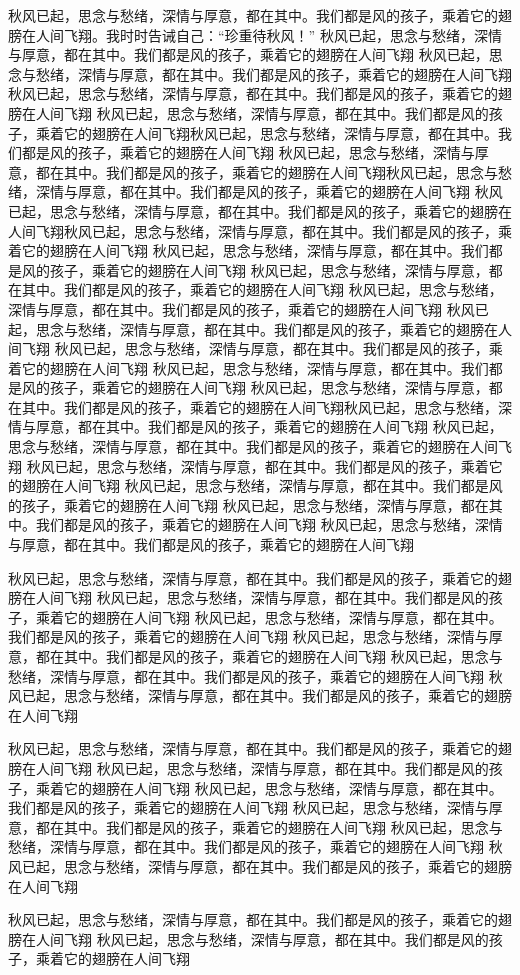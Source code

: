 秋风已起，思念与愁绪，深情与厚意，都在其中。我们都是风的孩子，乘着它的翅膀在人间飞翔。我时时告诫自己：“珍重待秋风！”
秋风已起，思念与愁绪，深情与厚意，都在其中。我们都是风的孩子，乘着它的翅膀在人间飞翔
秋风已起，思念与愁绪，深情与厚意，都在其中。我们都是风的孩子，乘着它的翅膀在人间飞翔秋风已起，思念与愁绪，深情与厚意，都在其中。我们都是风的孩子，乘着它的翅膀在人间飞翔
秋风已起，思念与愁绪，深情与厚意，都在其中。我们都是风的孩子，乘着它的翅膀在人间飞翔秋风已起，思念与愁绪，深情与厚意，都在其中。我们都是风的孩子，乘着它的翅膀在人间飞翔
秋风已起，思念与愁绪，深情与厚意，都在其中。我们都是风的孩子，乘着它的翅膀在人间飞翔秋风已起，思念与愁绪，深情与厚意，都在其中。我们都是风的孩子，乘着它的翅膀在人间飞翔
秋风已起，思念与愁绪，深情与厚意，都在其中。我们都是风的孩子，乘着它的翅膀在人间飞翔秋风已起，思念与愁绪，深情与厚意，都在其中。我们都是风的孩子，乘着它的翅膀在人间飞翔
秋风已起，思念与愁绪，深情与厚意，都在其中。我们都是风的孩子，乘着它的翅膀在人间飞翔
秋风已起，思念与愁绪，深情与厚意，都在其中。我们都是风的孩子，乘着它的翅膀在人间飞翔
秋风已起，思念与愁绪，深情与厚意，都在其中。我们都是风的孩子，乘着它的翅膀在人间飞翔
秋风已起，思念与愁绪，深情与厚意，都在其中。我们都是风的孩子，乘着它的翅膀在人间飞翔
秋风已起，思念与愁绪，深情与厚意，都在其中。我们都是风的孩子，乘着它的翅膀在人间飞翔
秋风已起，思念与愁绪，深情与厚意，都在其中。我们都是风的孩子，乘着它的翅膀在人间飞翔
秋风已起，思念与愁绪，深情与厚意，都在其中。我们都是风的孩子，乘着它的翅膀在人间飞翔秋风已起，思念与愁绪，深情与厚意，都在其中。我们都是风的孩子，乘着它的翅膀在人间飞翔
秋风已起，思念与愁绪，深情与厚意，都在其中。我们都是风的孩子，乘着它的翅膀在人间飞翔
秋风已起，思念与愁绪，深情与厚意，都在其中。我们都是风的孩子，乘着它的翅膀在人间飞翔
秋风已起，思念与愁绪，深情与厚意，都在其中。我们都是风的孩子，乘着它的翅膀在人间飞翔
秋风已起，思念与愁绪，深情与厚意，都在其中。我们都是风的孩子，乘着它的翅膀在人间飞翔
秋风已起，思念与愁绪，深情与厚意，都在其中。我们都是风的孩子，乘着它的翅膀在人间飞翔

秋风已起，思念与愁绪，深情与厚意，都在其中。我们都是风的孩子，乘着它的翅膀在人间飞翔
秋风已起，思念与愁绪，深情与厚意，都在其中。我们都是风的孩子，乘着它的翅膀在人间飞翔
秋风已起，思念与愁绪，深情与厚意，都在其中。我们都是风的孩子，乘着它的翅膀在人间飞翔
秋风已起，思念与愁绪，深情与厚意，都在其中。我们都是风的孩子，乘着它的翅膀在人间飞翔
秋风已起，思念与愁绪，深情与厚意，都在其中。我们都是风的孩子，乘着它的翅膀在人间飞翔
秋风已起，思念与愁绪，深情与厚意，都在其中。我们都是风的孩子，乘着它的翅膀在人间飞翔

秋风已起，思念与愁绪，深情与厚意，都在其中。我们都是风的孩子，乘着它的翅膀在人间飞翔
秋风已起，思念与愁绪，深情与厚意，都在其中。我们都是风的孩子，乘着它的翅膀在人间飞翔
秋风已起，思念与愁绪，深情与厚意，都在其中。我们都是风的孩子，乘着它的翅膀在人间飞翔
秋风已起，思念与愁绪，深情与厚意，都在其中。我们都是风的孩子，乘着它的翅膀在人间飞翔
秋风已起，思念与愁绪，深情与厚意，都在其中。我们都是风的孩子，乘着它的翅膀在人间飞翔
秋风已起，思念与愁绪，深情与厚意，都在其中。我们都是风的孩子，乘着它的翅膀在人间飞翔

秋风已起，思念与愁绪，深情与厚意，都在其中。我们都是风的孩子，乘着它的翅膀在人间飞翔
秋风已起，思念与愁绪，深情与厚意，都在其中。我们都是风的孩子，乘着它的翅膀在人间飞翔
